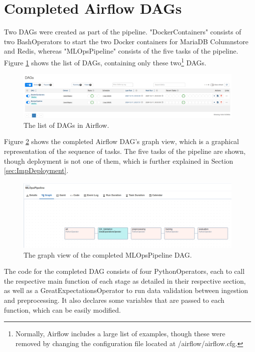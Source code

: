 \documentclass[12pt]{report}
\begin{document}
\section{Completed Airflow DAGs}
Two DAGs were created as part of the pipeline. "DockerContainers" consists of two BashOperators 
to start the two Docker containers for MariaDB Columnstore and Redis, whereas "MLOpsPipeline" 
consists of the five tasks of the pipeline. Figure \ref{fig:DAGsList} shows the list of DAGs, 
containing only these two\footnote{Normally, Airflow includes a large list of examples, though these were 
removed by changing the configuration file located at \texttildelow/airflow/airflow.cfg.} DAGs.

\begin{figure}[H]
    \centering
    \includegraphics[width=\linewidth]{Implementation/Airflow/DAGs/1.png}
    \caption{The list of DAGs in Airflow.}
    \label{fig:DAGsList}
\end{figure}

Figure \ref{fig:PipelineGraphDAG} shows the completed Airflow DAG's graph view, which is a graphical 
representation of the sequence of tasks. The five tasks of the pipeline are shown, 
though deployment is not one of them, which is further explained in Section \ref{sec:ImpDeployment}.

\begin{figure}[H]
    \centering
    \includegraphics[width=\linewidth]{Implementation/Airflow/DAGs/PipelineGraph.png}
    \caption{The graph view of the completed MLOpsPipeline DAG.}
    \label{fig:PipelineGraphDAG}
\end{figure}

The code for the completed DAG consists of four PythonOperators, each to call the respective main 
function of each stage as detailed in their respective section, as well as a GreatExpectationsOperator 
to run data validation between ingestion and preprocessing. It also declares some variables that are passed 
to each function, which can be easily modified.
\end{document}
